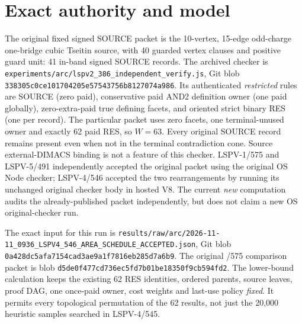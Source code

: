 \documentclass[11pt]{article}
\begin{document}
\section*{Exact authority and model}
The original fixed signed SOURCE packet is the 10-vertex, 15-edge odd-charge one-bridge cubic Tseitin source, with 40 guarded vertex clauses and positive guard unit: 41 in-band signed SOURCE records. The archived checker is
\texttt{experiments/arc/lspv2\_386\_independent\_verify.js}, Git blob
\texttt{338305c0ce101704205e57543756b8127074a986}.
Its authenticated \emph{restricted} rules are SOURCE (zero paid), conservative paid AND2 definition owner (one paid globally), zero-extra-paid true defining facets, and oriented strict binary RES (one per record). The particular packet uses zero facets, one terminal-unused owner and exactly 62 paid RES, so $W=63$. Every original SOURCE record remains present even when not in the terminal contradiction cone. Source external-DIMACS binding is not a feature of this checker. LSPV-1/575 and LSPV-5/491 independently accepted the original packet using the original OS Node checker; LSPV-4/546 accepted the two rearrangements by running its unchanged original checker body in hosted V8. The current \emph{new} computation audits the already-published packet independently, but does not claim a new OS original-checker run.

The exact input for this run is
\texttt{results/raw/arc/2026-11-11\_0936\_LSPV4\_546\_AREA\_SCHEDULE\_ACCEPTED.json},
Git blob \texttt{0a428dc5afa7154cad3ae9a1f7816eb285d7a6b9}.
The original /575 comparison packet is blob
\texttt{d5de0f477cd736ec5fd7b01be18350f9cb594fd2}.
The lower-bound calculation keeps the existing 62 RES identities, ordered parents, source leaves, proof DAG, one once-paid owner, cost weights and last-use policy \emph{fixed}. It permits every topological permutation of the 62 results, not just the 20,000 heuristic samples searched in LSPV-4/545.
\end{document}
